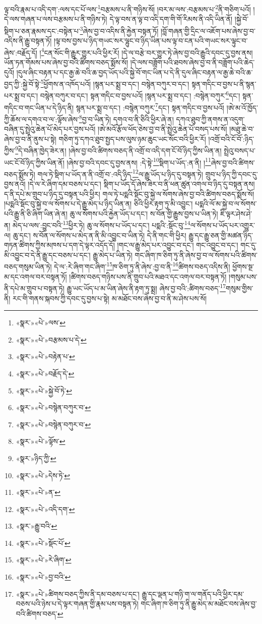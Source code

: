 ལྟ་བའི་རྣམ་པ་འདི་དག་:ལས་དང་པོ་ལས་\footnote{«སྣར་»«པེ་»ལས་}བརྩམས་པ་ནི་གཉིས་སོ། །བར་མ་ལས་:བརྩམས་པ་\footnote{«སྣར་»«པེ་»བརྩམས་པ་དེ་}ནི་གཅིག་པའོ། །དེ་ལས་གཞན་པ་ལས་བརྩམས་པ་ནི་གཉིས་ཏེ། དེ་ལྟ་བས་ན་ལྟ་བ་འདི་དག་གི་གོ་རིམས་ནི་འདི་ཡིན་ནོ། །སྐྱེ་བོ་སྡིག་པ་ཅན་རྣམས་དང་:བསྟེན་པ་\footnote{«སྣར་»«པེ་»བརྟེན་པ་}ཞེས་བྱ་བ་འདིས་ནི་རྐྱེན་བསྟན་ཏོ། །བློ་གཞན་གྱི་དྲིང་ལ་འཇོག་པས་ཞེས་བྱ་བ་འདིས་ནི་རྒྱུ་བསྟན་ཏོ། །ལྟ་བས་བྱས་པ་ཉིད་གཡང་སར་ལྷུང་བ་ཉིད་ཡིན་པས་ལྟ་བ་ངན་པའི་གཡང་སར་ལྟུང་བ་ཞེས་:བརྗོད་དོ། །\footnote{«སྣར་»«པེ་»བརྗོད་དེ་}ངན་སོང་གི་རྒྱུར་གྱུར་པའི་ཕྱིར་རོ། །དེ་ལ་བརྩེ་བར་གྱུར་ཏེ་ཞེས་བྱ་བའི་རྒྱུའི་དབང་དུ་བྱས་ནས། ཡོན་ཏན་གོམས་པས་ཞེས་བྱ་བའི་ཚིགས་བཅད་སྨོས་སོ། །དེ་ལས་བཟློག་པའི་ཐབས་ཞེས་བྱ་བ་ནི་བཟློག་པའི་ཆེད་དུའོ། །དུལ་ཞིང་བརྟན་པ་དང་རྒྱ་ཆེ་བའི་ཆ་བྱད་ཡོད་པའི་སྐྱེ་བོ་གང་ཡིན་པ་དེ་ནི་དུལ་ཞིང་བརྟན་ལ་རྒྱ་ཆེ་བའི་ཆ་བྱད་ཀྱི་:སྐྱེ་བོ་སྟེ་\footnote{«སྣར་»«པེ་»སྐྱེ་བོ་ཏེ་}ཕྱོགས་ན་འཁོད་པའོ། །སྙན་པར་སྨྲ་བ་དང་། བསྙེན་བཀུར་བ་དང་། སྟན་གདིང་བ་བྱས་པ་ནི་སྙན་པར་སྨྲ་བ་དང་། བསྙེན་བཀུར་བ་དང་། སྟན་གདིང་བ་བྱས་པའོ། །སྙན་པར་སྨྲ་བ་དང་། :བསྙེན་བཀུར་\footnote{«སྣར་»«པེ་»བསྙེན་བཀུར་བ་}དང་། སྟན་གདིང་བ་གང་ཡིན་པ་དེ་ཉིད་ནི། སྙན་པར་སྨྲ་བ་དང་། :བསྙེན་བཀུར་\footnote{«སྣར་»«པེ་»བསྙེན་བཀུར་བ་}དང་། སྟན་གདིང་བ་བྱས་པའོ། །ཨེ་མ་འོ་ཁྱོད་ཀྱི་ཆོས་ལ་དགའ་བ་ལ་:ལྟོས་ཞེས་\footnote{«སྣར་»«པེ་»ལྟོས་}བྱ་བ་ཡིན་ཏེ། དགའ་བ་ནི་ཅིའི་ཕྱིར་ཞེ་ན། དཀའ་ཐུབ་ཀྱི་ནགས་ན་འདུག་བཞིན་དུ་སྤྲེའུ་ཆེན་པོ་མེད་པར་བྱས་པའོ། །ཨེ་མའོ་རྩོལ་ཕོད་ཅེས་བྱ་བ་ནི་སྤྲེའུ་ཆེན་པོ་བསད་པས་སོ། །མཐུ་ཆེ་བ་ཞེས་བྱ་བ་ནི་ནུས་པ་སྟེ། གཅིག་ཏུ་དཀའ་ཐུབ་སྤྱད་པས་ལུས་ཉམ་ཆུང་ཡང་སོང་བའི་ཕྱིར་རོ། །འགྲོ་བའི་ངོ་བོ་:ཉིད་ཀྱིས་\footnote{«སྣར་»ཉིད་ཀྱི་}དེ་བཞིན་ཁྱེད་ཟེར་ན། །ཞེས་བྱ་བའི་ཚིགས་བཅད་ནི་འགྲོ་བ་འདི་དག་ངོ་བོ་ཉིད་ཀྱིས་ཡིན་ན། སྤྲེའུ་བསད་པ་ཡང་ངོ་བོ་ཉིད་ཀྱིས་ཡིན་ནོ། །ཞེས་བྱ་བའི་དབང་དུ་བྱས་ནས། :དེ་སྟེ་\footnote{«སྣར་»«པེ་»དེས་ཏེ་}སྡིག་པ་ཡོད་:ན་ནི། །\footnote{«སྣར་»«པེ་»ན་}ཞེས་བྱ་བའི་ཚིགས་བཅད་སྨོས་ཏེ། གལ་ཏེ་སྡིག་པ་ཡོད་ན་ནི་འགྲོ་བ་:འདི་ཉིད་\footnote{«སྣར་»«པེ་»འདི་དག་}ལ་རྒྱུ་ཡོད་པ་ཉིད་དུ་བསྟན་ཏེ། གྲུབ་པ་ཉིད་ཀྱི་དབང་དུ་བྱས་ནའོ། །དེ་ལ་རེ་ཞིག་དམ་བཅས་པ་དང་། སྡིག་པ་ཡོད་དོ་ཞེས་ཟེར་བ་ནི་ཕན་ཚུན་འགལ་བ་ཉིད་དུ་བསྟན་ནས། ད་ནི་དཔེ་མ་གྲུབ་པ་ཉིད་དུ་བསྟན་པའི་ཕྱིར། གལ་ཏེ་པདྨའི་སྡོང་བུ་སྐྱེ་ལ་སོགས་ཞེས་བྱ་བའི་ཚིགས་བཅད་སྨོས་སོ། །པདྨའི་སྡོང་བུ་སྐྱེ་བ་ལ་སོགས་པ་དེ་རྒྱུ་མེད་པ་ཉིད་ཡིན་ན། ཅིའི་ཕྱིར་རྟག་ཏུ་མི་འབྱུང་། པདྨའི་ལོ་མ་སྐྱེ་བ་ལ་སོགས་པའི་རྒྱུ་ནི་ཅི་ཞིག་ཡིན་ཞེ་ན། ཆུ་ལ་སོགས་པའི་རྐྱེན་ཡོད་པ་དང་། ས་བོན་གྱི་རྒྱུས་བྱས་པ་ཡིན་ཏེ། ཇི་ལྟར་ཤེས་ཤེ་ན། མེད་པ་ལས་:བྱུང་བའི་\footnote{«སྣར་»རྒྱུ་བའི་}ཕྱིར་ཏེ། ཆུ་ལ་སོགས་པ་ཡོད་པ་དང་། པདྨའི་:སྡོང་བུ་\footnote{«སྣར་»«པེ་»སྡོང་པོ་}ལ་སོགས་པ་ཡོད་པར་འགྱུར་ལ། ཆུ་དང་། ས་བོན་ལ་སོགས་པ་མེད་ན་ནི་མི་འབྱུང་བ་ཡིན་ཏེ། དེ་ནི་གང་གི་ཕྱིར། རྒྱུ་དང་རྒྱུ་ཅན་གྱི་མཚན་ཉིད་གཏན་ཚིགས་ཀྱིས་མཁས་པ་དག་དེ་ལྟར་འདོད་དོ། །གང་ལ་རྒྱུ་མེད་པར་འབྱུང་བ་དང་། གང་འབྱུང་བ་དང་། གང་དུ་མི་འབྱུང་བ་དེ་ནི་རྒྱུ་དང་བཅས་པ་དང་། རྒྱུ་མེད་པ་ཡིན་ཏེ། གང་ཞིག་ཁ་ཅིག་ཏུ་ནི་ཞེས་བྱ་བ་ལ་སོགས་པའི་ཚིགས་བཅད་གསུམ་ཡིན་ཏེ། དེ་ལ་:རེ་ཞིག་གང་ཞིག་\footnote{«སྣར་»«པེ་»རེ་ཞིག་}ཁ་ཅིག་ཏུ་ནི་ཞེས་:བྱ་བ་ནི་\footnote{«སྣར་»«པེ་»བྱ་བའི་}ཚིགས་བཅད་འདིས་ནི། ཕྱོགས་སྔ་མ་དང་འགལ་བར་བསྟན་ཏོ། །ཚིགས་བཅད་གཉིས་པས་ནི་གྲུབ་པའི་མཐའ་དང་འགལ་བར་བསྟན་ཏོ། །གསུམ་པས་ནི་དཔེ་མ་གྲུབ་པ་བསྟན་ཏེ། རྒྱུ་ཡང་ཡོད་པ་མ་ཡིན་ཞེས་ནི་རྟག་ཏུ་སྨྲ། ཞེས་བྱ་བའི་:ཚིགས་བཅད་\footnote{«སྣར་»«པེ་»ཚིགས་བཅད་ཀྱིས་ནི་དམ་བཅས་པ་དང་། རྒྱུ་དང་ལྡན་པ་གཉི་ག་ལ་གནོད་པའི་ཕྱིར་དམ་བཅས་པའི་ཉེས་པ་དེ་ལྟར་གཞན་གྱི་རྣམ་པས་བསྟན་ཏེ། གང་ཞིག་ཁ་ཅིག་ཏུ་ནི་རྒྱུ་མེད་མ་མཐོང་བས་ཞེས་བྱ་བའི་ཚིགས་བཅད་}གསུམ་གྱིས་ནི། རང་གི་གནས་སྐབས་ཀྱི་དབང་དུ་བྱས་པ་སྟེ། མ་མཐོང་བས་ཞེས་བྱ་བ་ནི་མ་ཤེས་པས་སོ། 